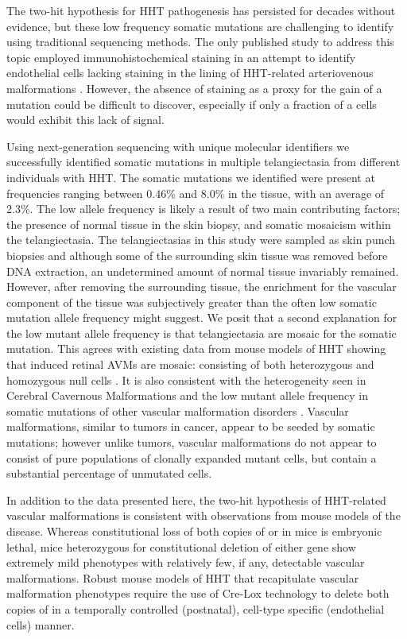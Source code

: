 The two-hit hypothesis for HHT pathogenesis has persisted for decades without evidence, but these low frequency somatic mutations are challenging to identify using traditional sequencing methods.  The only published study to address this topic employed immunohistochemical staining in an attempt to identify endothelial cells lacking staining in the lining of HHT-related arteriovenous malformations \citep{bourdeau2000}. However, the absence of staining as a proxy for the gain of a mutation could be difficult to discover, especially if only a fraction of a cells would exhibit this lack of signal.

Using next-generation sequencing with unique molecular identifiers we successfully identified somatic mutations in multiple telangiectasia from different individuals with HHT.  The somatic mutations we identified were present at frequencies ranging between 0.46\% and 8.0\% in the tissue, with an average of 2.3\%. The low allele frequency is likely a result of two main contributing factors; the presence of normal tissue in the skin biopsy, and somatic mosaicism within the telangiectasia. The telangiectasias in this study were sampled as skin punch biopsies and although some of the surrounding skin tissue was removed before DNA extraction, an undetermined amount of normal tissue invariably remained.  However, after removing the surrounding tissue, the enrichment for the vascular component of the tissue was subjectively greater than the often low somatic mutation allele frequency might suggest. We posit that a second explanation for the low mutant allele frequency is that telangiectasia are mosaic for the somatic mutation. This agrees with existing data from mouse models of HHT showing that induced retinal AVMs are mosaic: consisting of both heterozygous and homozygous null cells \citep{jin2017}. It is also consistent with the heterogeneity seen in Cerebral Cavernous Malformations \citep{detter2018, malinverno2019} and the low mutant allele frequency in somatic mutations of other vascular malformation disorders \citep{alolabi2018, soblet2017, limaye2015, limaye2009, shirley2013, couto2015, luks2015, nikolaev2018, couto2017, akers2009, mcdonald2014}.  Vascular malformations, similar to tumors in cancer, appear to be seeded by somatic mutations; however unlike tumors, vascular malformations do not appear to consist of pure populations of clonally expanded mutant cells, but contain a substantial percentage of unmutated cells.   	

	In addition to the data presented here, the two-hit hypothesis of HHT-related vascular malformations is consistent with observations from mouse models of the disease. Whereas constitutional loss of both copies of  or  in mice is embryonic lethal, mice heterozygous for constitutional deletion of either gene show extremely mild phenotypes with relatively few, if any, detectable vascular malformations\citep{bourdeau1999, srinivasan2003}. Robust mouse models of HHT that recapitulate vascular malformation phenotypes require the use of Cre-Lox technology to delete both copies of  in a temporally controlled (postnatal), cell-type specific (endothelial cells) manner. 
	
